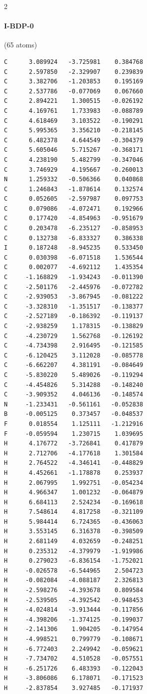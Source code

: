 \begin{multicols}{2}
\paragraph{I-BDP-0} (65 atoms)
{\scriptsize\linespread{1}\selectfont\begin{verbatim}
C      3.089924   -3.725981    0.384768
C      2.597850   -2.329907    0.239839
C      3.382706   -1.203853    0.195169
C      2.537786   -0.077069    0.067660
C      2.894221    1.300515   -0.026192
C      4.169761    1.733983   -0.088789
C      4.618469    3.103522   -0.190291
C      5.995365    3.356210   -0.218145
C      6.482378    4.644549   -0.304379
C      5.605046    5.715267   -0.368171
C      4.238190    5.482799   -0.347046
C      3.746929    4.195667   -0.260013
N      1.259332   -0.506366    0.040868
C      1.246843   -1.878614    0.132574
C      0.052605   -2.597987    0.097753
C      0.079086   -4.072471    0.192966
C      0.177420   -4.854963   -0.951679
C      0.203478   -6.235127   -0.858953
C      0.132738   -6.833327    0.386338
I      0.187248   -8.945235    0.533450
C      0.030398   -6.071518    1.536544
C      0.002077   -4.692112    1.435354
C     -1.168829   -1.934243   -0.011390
C     -2.501176   -2.445976   -0.072782
C     -2.939053   -3.867945   -0.081222
C     -3.328310   -1.351517   -0.138377
C     -2.527189   -0.186392   -0.119137
C     -2.938259    1.178315   -0.138829
C     -4.230729    1.562768   -0.126192
C     -4.734398    2.916495   -0.121585
C     -6.120425    3.112028   -0.085778
C     -6.662207    4.381191   -0.084649
C     -5.830220    5.489026   -0.119294
C     -4.454826    5.314288   -0.148240
C     -3.909352    4.046136   -0.148574
N     -1.233431   -0.561161   -0.052838
B     -0.005125    0.373457   -0.048537
F      0.018554    1.125111   -1.212916
F     -0.059594    1.230715    1.039695
H      4.176772   -3.726841    0.417879
H      2.712706   -4.177618    1.301584
H      2.764522   -4.346141   -0.448829
H      4.452661   -1.178878    0.253937
H      2.067995    1.992751   -0.054234
H      4.966347    1.001232   -0.064879
H      6.684113    2.524234   -0.169618
H      7.548614    4.817258   -0.321109
H      5.984414    6.724365   -0.436063
H      3.553145    6.316378   -0.398509
H      2.681149    4.032659   -0.248251
H      0.235312   -4.379979   -1.919986
H      0.279023   -6.836154   -1.752021
H     -0.026578   -6.544965    2.504723
H     -0.082084   -4.088187    2.326813
H     -2.598276   -4.393678    0.809584
H     -2.539505   -4.392542   -0.948453
H     -4.024814   -3.913444   -0.117856
H     -4.398206   -1.374125   -0.199037
H     -2.141306    1.904205   -0.147954
H     -4.998521    0.799779   -0.108671
H     -6.772403    2.249942   -0.059621
H     -7.734702    4.510528   -0.057551
H     -6.251726    6.483393   -0.122043
H     -3.806086    6.178071   -0.171523
H     -2.837854    3.927485   -0.171937
\end{verbatim}}

\end{multicols}
